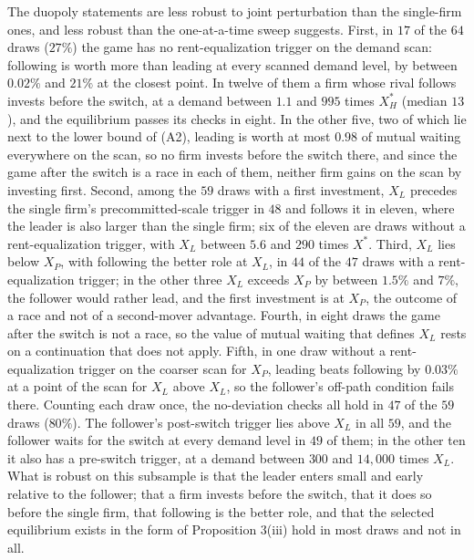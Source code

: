 \documentclass[
  11pt,
  letterpaper,
]{scrartcl}
\begin{document}
The duopoly statements are less robust to joint perturbation than the
single-firm ones, and less robust than the one-at-a-time sweep suggests.
First, in \(17\) of the \(64\) draws (\(27\%\)) the game has no
rent-equalization trigger on the demand scan: following is worth more
than leading at every scanned demand level, by between \(0.02\%\) and
\(21\%\) at the closest point. In twelve of them a firm whose rival
follows invests before the switch, at a demand between \(1.1\) and
\(995\) times \(X_H^*\) (median \(13\)), and the equilibrium passes its
checks in eight. In the other five, two of which lie next to the lower
bound of (A2), leading is worth at most \(0.98\) of mutual waiting
everywhere on the scan, so no firm invests before the switch there, and
since the game after the switch is a race in each of them, neither firm
gains on the scan by investing first. Second, among the \(59\) draws
with a first investment, \(X_L\) precedes the single firm's
precommitted-scale trigger in \(48\) and follows it in eleven, where the
leader is also larger than the single firm; six of the eleven are draws
without a rent-equalization trigger, with \(X_L\) between \(5.6\) and
\(290\) times \(X^*\). Third, \(X_L\) lies below \(X_P\), with following
the better role at \(X_L\), in \(44\) of the \(47\) draws with a
rent-equalization trigger; in the other three \(X_L\) exceeds \(X_P\) by
between \(1.5\%\) and \(7\%\), the follower would rather lead, and the
first investment is at \(X_P\), the outcome of a race and not of a
second-mover advantage. Fourth, in eight draws the game after the switch
is not a race, so the value of mutual waiting that defines \(X_L\) rests
on a continuation that does not apply. Fifth, in one draw without a
rent-equalization trigger on the coarser scan for \(X_P\), leading beats
following by \(0.03\%\) at a point of the scan for \(X_L\) above
\(X_L\), so the follower's off-path condition fails there. Counting each
draw once, the no-deviation checks all hold in \(47\) of the \(59\)
draws (\(80\%\)). The follower's post-switch trigger lies above \(X_L\)
in all \(59\), and the follower waits for the switch at every demand
level in \(49\) of them; in the other ten it also has a pre-switch
trigger, at a demand between \(300\) and \(14{,}000\) times \(X_L\).
What is robust on this subsample is that the leader enters small and
early relative to the follower; that a firm invests before the switch,
that it does so before the single firm, that following is the better
role, and that the selected equilibrium exists in the form of
Proposition 3(iii) hold in most draws and not in all.
\end{document}
